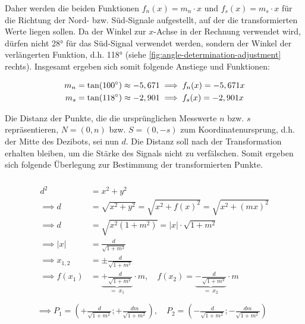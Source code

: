 Daher werden die beiden Funktionen $f_n(x)=m_n\cdot x$ und $f_s(x)=m_s\cdot x$ für die Richtung der Nord- bzw. Süd\hyphen Signale aufgestellt, auf der die transformierten Werte liegen sollen. Da der Winkel zur $x$-Achse in der Rechnung verwendet wird, dürfen nicht 28° für das Süd-Signal verwendet werden, sondern der Winkel der verlängerten Funktion, d.h. 118° (siehe \autoref{fig:angle-determination-adjustment} rechts). Insgesamt ergeben sich somit folgende Anstiege und Funktionen:

\vspace{-1cm}
\begin{gather*}
    m_n = \tan(100^\circ) \approx -5,671 \implies f_n(x) = -5,671x \\
    m_s = \tan(118^\circ) \approx -2,901 \implies f_s(x) = -2,901x
\end{gather*}
\vspace{-1cm}

Die Distanz der Punkte, die die ursprünglichen Messwerte $n$ bzw. $s$ repräsentieren, $N=(0,n)$ bzw. $S=(0,-s)$ zum Koordinatenursprung, d.h. der Mitte des Dezibots, sei nun $d$. Die Distanz soll nach der Transformation erhalten bleiben, um die Stärke des Signals nicht zu verfälschen. Somit ergeben sich folgende Überlegung zur Bestimmung der transformierten Punkte.

\begin{gather*}
    ~\\[-1.25cm]
    \begin{aligned}
        d^2 &= x^2 + y^2 \\
        \implies d &= \sqrt{x^2 + y^2} = \sqrt{x^2 + f(x)^2} = \sqrt{x^2 + (mx)^2} \\
        \implies d &= \sqrt{x^2 (1 + m^2)} = |x| \cdot \sqrt{1+m^2} \\
        \implies |x| &= \frac{d}{\sqrt{1+m^2}} \\
        \implies x_{1,2} &= \pm \frac{d}{\sqrt{1+m^2}} \\
        \implies f(x_1) &= \underbrace{+ \frac{d}{\sqrt{1+m^2}}}_{=~x_1} \cdot m, \quad
    f(x_2) = \underbrace{- \frac{d}{\sqrt{1+m^2}}}_{=~x_2} \cdot m \\
    \end{aligned} \\
    \implies P_1=\left(+ \frac{d}{\sqrt{1+m^2}}; + \frac{dm}{\sqrt{1+m^2}}\right), \quad
    P_2=\left(-\frac{d}{\sqrt{1+m^2}}; -\frac{dm}{\sqrt{1+m^2}}\right)
\end{gather*}
\vspace{-0.5cm}

